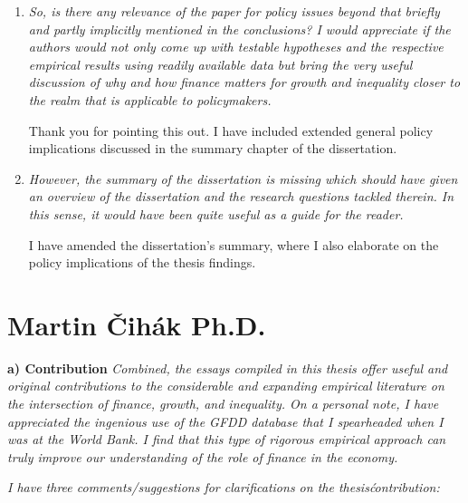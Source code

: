 \begin{enumerate}
    \item \textit{So, is there any relevance of the paper for policy issues beyond that briefly and partly implicitly mentioned in the conclusions? I would appreciate if the authors would not only come up with testable hypotheses and the respective empirical results using readily available data but bring the very useful discussion of why and how finance matters for growth and inequality closer to the realm that is applicable to policymakers.}
    
    Thank you for pointing this out. I have included extended general policy implications discussed in the summary chapter of the dissertation.

    \item \textit{However, the summary of the dissertation is missing which should have given an overview of the dissertation and the research questions tackled therein. In this sense, it would have been quite useful as a guide for the reader.}
    
    I have amended the dissertation's summary, where I also elaborate on the policy implications of the thesis findings.

\end{enumerate}

\section{Martin \v{C}ih\'{a}k Ph.D.}

\textbf{a) Contribution}
\textit{Combined, the essays compiled in this thesis offer useful and original contributions to the considerable and expanding empirical literature on the intersection of finance, growth, and inequality. On a personal note, I have appreciated the ingenious use of the GFDD database that I spearheaded when I was at the World Bank. I find that this type of rigorous empirical approach can truly improve our understanding of the role of finance in the economy.}

\textit{I have three comments/suggestions for clarifications on the thesis\' contribution:}

